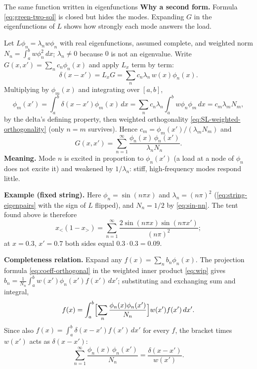 \documentclass[11pt]{beamer}
\begin{document}
\begin{frame}[allowframebreaks=1.00]{The same function written in eigenfunctions}
\footnotesize
\textbf{Why a second form.} Formula \eqref{eq:green-two-sol} is closed but hides the
modes. Expanding $G$ in the eigenfunctions of $L$ shows how strongly each mode
answers the load.

Let $L\phi_n=\lambda_nw\phi_n$ with real eigenfunctions, assumed complete, and weighted
norm $N_n=\int_a^bw\phi_n^2\,dx$; $\lambda_n\ne0$ because $0$ is not an eigenvalue.
Write $G(x,x')=\sum_nc_n\phi_n(x)$ and apply $L_x$ term by term:
\[
 \delta(x-x')=L_xG=\sum_{n}c_n\lambda_n\,w(x)\phi_n(x).
\]
Multiplying by $\phi_m(x)$ and integrating over $[a,b]$,
\[
 \phi_m(x')=\int_a^b\delta(x-x')\phi_m(x)\,dx
 =\sum_nc_n\lambda_n\int_a^bw\phi_n\phi_m\,dx
 =c_m\lambda_mN_m,
\]
by the delta's defining property, then weighted orthogonality
\eqref{eq:SL-weighted-orthogonality} (only $n=m$ survives). Hence
$c_m=\phi_m(x')/(\lambda_mN_m)$ and
\begin{equation}
 G(x,x')=\sum_{n=1}^{\infty}\frac{\phi_n(x)\,\phi_n(x')}{\lambda_nN_n}.
 \label{eq:green-spectral}
\end{equation}
\textbf{Meaning.} Mode $n$ is excited in proportion to $\phi_n(x')$ (a load at a node
of $\phi_n$ does not excite it) and weakened by $1/\lambda_n$: stiff, high-frequency
modes respond little.

\textbf{Example (fixed string).} Here $\phi_n=\sin(n\pi x)$ and $\lambda_n=(n\pi)^2$
(\eqref{eq:string-eigenpairs} with the sign of $L$ flipped), and $N_n=1/2$ by \eqref{eq:sin-nn}.
The tent found above is therefore
\[
 x_<(1-x_>)=\sum_{n=1}^{\infty}\frac{2\sin(n\pi x)\sin(n\pi x')}{(n\pi)^2};
\]
at $x=0.3$, $x'=0.7$ both sides equal $0.3\cdot0.3=0.09$.

\textbf{Completeness relation.} Expand any $f(x)=\sum_nb_n\phi_n(x)$. The projection
formula \eqref{eq:coeff-orthogonal} in the weighted inner product \eqref{eq:wip} gives
$b_n=\frac1{N_n}\int_a^bw(x')\phi_n(x')f(x')\,dx'$; substituting and exchanging sum and
integral,
\[
 f(x)=\int_a^b\Bigl[\sum_n\frac{\phi_n(x)\phi_n(x')}{N_n}\Bigr]w(x')f(x')\,dx'.
\]
Since also $f(x)=\int_a^b\delta(x-x')f(x')\,dx'$ for every $f$, the bracket times
$w(x')$ acts as $\delta(x-x')$:
\begin{equation}
 \sum_{n=1}^{\infty}\frac{\phi_n(x)\,\phi_n(x')}{N_n}
 =\frac{\delta(x-x')}{w(x')}.
 \label{eq:completeness}
\end{equation}


\end{frame}
\end{document}
